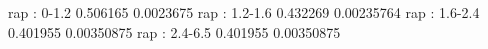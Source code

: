 rap : 0-1.2
0.506165 0.0023675
rap : 1.2-1.6
0.432269 0.00235764
rap : 1.6-2.4
0.401955 0.00350875
rap : 2.4-6.5
0.401955 0.00350875
